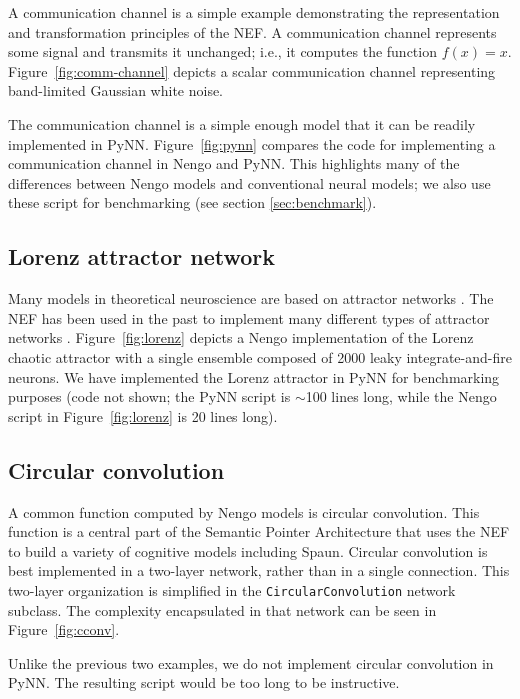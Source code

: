 \documentclass{frontiersSCNS}
\begin{document}
A communication channel
is a simple example demonstrating
the representation and transformation principles
of the NEF.
A communication channel
represents some signal and transmits it unchanged;
i.e., it computes the function $f(x) = x$.
Figure~\ref{fig:comm-channel}
depicts a scalar communication channel
representing band-limited Gaussian white noise.

The communication channel
is a simple enough model
that it can be readily implemented in PyNN.
Figure~\ref{fig:pynn} compares the code
for implementing a communication channel in Nengo and PyNN.
This highlights many of the differences
between Nengo models and conventional neural models;
we also use these script for benchmarking
(see section \ref{sec:benchmark}).

\subsection{Lorenz attractor network} \label{sec:lorenz}


Many models in theoretical neuroscience
are based on attractor networks \citep{amit1992, deco2003}.
The NEF has been used in the past
to implement many different types of
attractor networks \citep{eliasmith2005}.
Figure~\ref{fig:lorenz} depicts
a Nengo implementation of the Lorenz chaotic attractor
with a single ensemble
composed of 2000 leaky integrate-and-fire neurons.
We have implemented the Lorenz attractor
in PyNN for benchmarking purposes
(code not shown; the PyNN script is $\sim$100 lines long,
while the Nengo script in Figure~\ref{fig:lorenz}
is 20 lines long).

\subsection{Circular convolution} \label{sec:cconv}


A common function computed by Nengo models
is circular convolution.
This function is a central part
of the Semantic Pointer Architecture \citep{eliasmith2013}
that uses the NEF to build
a variety of cognitive models including Spaun.
Circular convolution
is best implemented in a two-layer network,
rather than in a single connection.
This two-layer organization is simplified in
the \texttt{CircularConvolution} network subclass.
The complexity encapsulated in that network
can be seen in Figure~\ref{fig:cconv}.

Unlike the previous two examples,
we do not implement
circular convolution in PyNN.
The resulting script would be
too long to be instructive.
\end{document}
